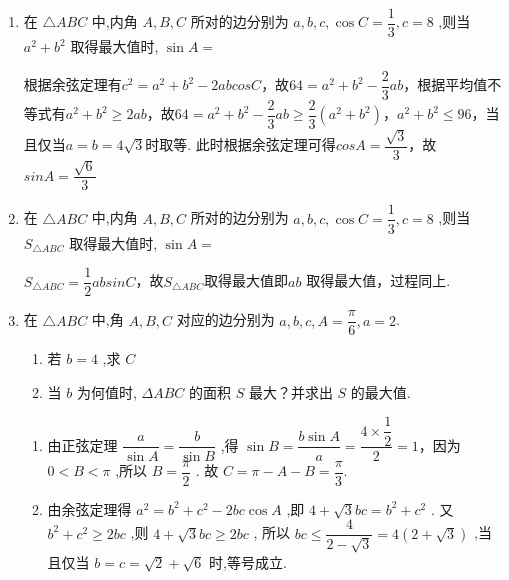 \begin{enumerate}
\begin{enumerate}
\begin{jieda}
        根据余弦定理有$c^2 = a^2+b^2-2abcosC$，故$64 = a^2+b^2-\dfrac{2}{3}ab$，根据平均值不等式有$a^2+b^2 \geq 2ab$，故$64 = a^2+b^2-\dfrac{2}{3}ab \geq \dfrac{4}{3}ab$，$ab \leq 48$，当且仅当$a = b = 4\sqrt{3}$时取等. 此时根据余弦定理可得$cosA = \dfrac{\sqrt{3}}{3}$，故$sinA = \dfrac{\sqrt{6}}{3}$
    \end{jieda}
    \item 在 $\bigtriangleup  {ABC}$ 中,内角 $A,B,C$ 所对的边分别为 $a,b,c,\cos C = \dfrac{1}{3},c = 8$ ,则当 $a^2 + b^2$ 取得最大值时, $\sin A =$
    \begin{jieda}
        根据余弦定理有$c^2 = a^2+b^2-2abcosC$，故$64 = a^2+b^2-\dfrac{2}{3}ab$，根据平均值不等式有$a^2+b^2 \geq 2ab$，故$64 = a^2+b^2-\dfrac{2}{3}ab \geq \dfrac{2}{3}(a^2+b^2)$，$a^2+b^2 \leq 96$，当且仅当$a = b = 4\sqrt{3}$时取等. 此时根据余弦定理可得$cosA = \dfrac{\sqrt{3}}{3}$，故$sinA = \dfrac{\sqrt{6}}{3}$
    \end{jieda}
    \item 在 $\bigtriangleup  {ABC}$ 中,内角 $A,B,C$ 所对的边分别为 $a,b,c,\cos C = \dfrac{1}{3},c = 8$ ,则当 $S_{\triangle ABC}$ 取得最大值时, $\sin A =$
    \begin{jieda}
        $S_{\triangle ABC} = \dfrac{1}{2}absinC$，故$S_{\triangle ABC}$取得最大值即$ab$ 取得最大值，过程同上.
    \end{jieda}
    \item 在 $\bigtriangleup  {ABC}$ 中,角 $A,B,C$ 对应的边分别为 $a,b,c,A = \dfrac{\pi }{6},a = 2$.
    \begin{enumerate}
        \item 若 $b = 4$ ,求 $C$
        \item 当 $b$ 为何值时, ${\Delta ABC}$ 的面积 $S$ 最大？并求出 $S$ 的最大值.
    \end{enumerate}
    \begin{jieda}
        \begin{enumerate}
            \item 由正弦定理 $\dfrac{a}{\sin A} = \dfrac{b}{\sin B}$ ,得 $\sin B = \dfrac{b\sin A}{a} = \dfrac{4 \times  \dfrac{1}{2}}{2} = 1$，因为 $0 < B < \pi$ ,所以 $B = \dfrac{\pi }{2}$ .
            故 $C = \pi  - A - B = \dfrac{\pi }{3}$.
            \item 由余弦定理得 ${a^2} = {b}^{2} + {c}^{2} - {2bc}\cos A$ ,即 $4 + \sqrt{3}{bc} = {b}^{2} + {c}^{2}$ .
            又 ${b}^{2} + {c}^{2} \geq  {2bc}$ ,则 $4 + \sqrt{3}{bc} \geq  {2bc}$ ,
            所以 ${bc} \leq  \dfrac{4}{2 - \sqrt{3}} = 4\left( {2 + \sqrt{3}}\right)$ ,当且仅当 $b = c = \sqrt{2} + \sqrt{6}$ 时,等号成立.

\end{enumerate}
\end{jieda}
\end{enumerate}
\end{enumerate}
